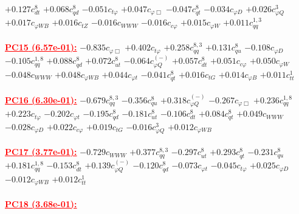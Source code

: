 \documentclass{article}
\begin{document}
{$+0.127$}{\rm $c_{dt}^{8}$}
{$+0.068$}{\rm $c_{qd}^{8}$}
{$-0.051$}{\rm $c_{t \varphi}$}
{$+0.047$}{\rm $c_{\varphi \Box}$}
{$-0.047$}{\rm $c_{qt}^{8}$}
{$-0.034$}{\rm $c_{\varphi D}$}
{$+0.026$}{\rm $c_{\varphi Q}^{3}$}
{$+0.017$}{\rm $c_{\varphi WB}$}
{$+0.016$}{\rm $c_{tZ}$}
{$-0.016$}{\rm $c_{WWW}$}
{$-0.016$}{\rm $c_{c \varphi}$}
{$+0.015$}{\rm $c_{\varphi W}$}
{$+0.011$}{\rm $c_{qq}^{1,3}$}
 \nonumber \\ \nonumber \\
\noindent \textcolor{red}{\underline{\bf{PC15} (6.57e-01):}}
{$-0.835$}{\rm $c_{\varphi \Box}$}
{$+0.402$}{\rm $c_{t \varphi}$}
{$+0.258$}{\rm $c_{qq}^{8,3}$}
{$+0.131$}{\rm $c_{qu}^{8}$}
{$-0.108$}{\rm $c_{\varphi D}$}
{$-0.105$}{\rm $c_{qq}^{1,8}$}
{$+0.088$}{\rm $c_{qd}^{8}$}
{$+0.072$}{\rm $c_{ut}^{8}$}
{$-0.064$}{\rm $c_{\varphi Q}^{(-)}$}
{$+0.057$}{\rm $c_{dt}^{8}$}
{$+0.051$}{\rm $c_{c \varphi}$}
{$+0.050$}{\rm $c_{\varphi W}$}
{$-0.048$}{\rm $c_{WWW}$}
{$+0.048$}{\rm $c_{\varphi WB}$}
{$+0.044$}{\rm $c_{\varphi t}$}
{$-0.041$}{\rm $c_{qt}^{8}$}
{$+0.016$}{\rm $c_{tG}$}
{$+0.014$}{\rm $c_{\varphi B}$}
{$+0.011$}{\rm $c_{tt}^{1}$}
 \nonumber \\ \nonumber \\
\noindent \textcolor{red}{\underline{\bf{PC16} (6.30e-01):}}
{$-0.679$}{\rm $c_{qq}^{8,3}$}
{$-0.356$}{\rm $c_{qu}^{8}$}
{$+0.318$}{\rm $c_{\varphi Q}^{(-)}$}
{$-0.267$}{\rm $c_{\varphi \Box}$}
{$+0.236$}{\rm $c_{qq}^{1,8}$}
{$+0.223$}{\rm $c_{t \varphi}$}
{$-0.202$}{\rm $c_{\varphi t}$}
{$-0.195$}{\rm $c_{qd}^{8}$}
{$-0.181$}{\rm $c_{ut}^{8}$}
{$-0.106$}{\rm $c_{dt}^{8}$}
{$+0.084$}{\rm $c_{qt}^{8}$}
{$+0.049$}{\rm $c_{WWW}$}
{$-0.028$}{\rm $c_{\varphi D}$}
{$+0.022$}{\rm $c_{c \varphi}$}
{$+0.019$}{\rm $c_{tG}$}
{$-0.016$}{\rm $c_{\varphi Q}^{3}$}
{$+0.012$}{\rm $c_{\varphi WB}$}
 \nonumber \\ \nonumber \\
\noindent \textcolor{red}{\underline{\bf{PC17} (3.77e-01):}}
{$-0.729$}{\rm $c_{WWW}$}
{$+0.377$}{\rm $c_{qq}^{8,3}$}
{$-0.297$}{\rm $c_{ut}^{8}$}
{$+0.293$}{\rm $c_{qt}^{8}$}
{$-0.231$}{\rm $c_{qu}^{8}$}
{$+0.181$}{\rm $c_{qq}^{1,8}$}
{$-0.153$}{\rm $c_{dt}^{8}$}
{$+0.139$}{\rm $c_{\varphi Q}^{(-)}$}
{$-0.120$}{\rm $c_{qd}^{8}$}
{$-0.073$}{\rm $c_{\varphi t}$}
{$-0.045$}{\rm $c_{t \varphi}$}
{$+0.025$}{\rm $c_{\varphi D}$}
{$-0.012$}{\rm $c_{\varphi WB}$}
{$+0.012$}{\rm $c_{tt}^{1}$}
 \nonumber \\ \nonumber \\
\noindent \textcolor{red}{\underline{\bf{PC18} (3.68e-01):}}
\end{document}
